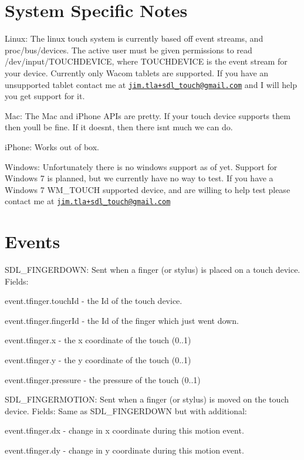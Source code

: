 \section*{System Specific Notes }

Linux\+: The linux touch system is currently based off event streams, and proc/bus/devices. The active user must be given permissions to read /dev/input/\+T\+O\+U\+C\+H\+D\+E\+V\+I\+CE, where T\+O\+U\+C\+H\+D\+E\+V\+I\+CE is the event stream for your device. Currently only Wacom tablets are supported. If you have an unsupported tablet contact me at \href{mailto:jim.tla+sdl_touch@gmail.com}{\tt jim.\+tla+sdl\+\_\+touch@gmail.\+com} and I will help you get support for it.

Mac\+: The Mac and i\+Phone A\+P\+Is are pretty. If your touch device supports them then you\textquotesingle{}ll be fine. If it doesn\textquotesingle{}t, then there isn\textquotesingle{}t much we can do.

i\+Phone\+: Works out of box.

Windows\+: Unfortunately there is no windows support as of yet. Support for Windows 7 is planned, but we currently have no way to test. If you have a Windows 7 W\+M\+\_\+\+T\+O\+U\+CH supported device, and are willing to help test please contact me at \href{mailto:jim.tla+sdl_touch@gmail.com}{\tt jim.\+tla+sdl\+\_\+touch@gmail.\+com} 

 \section*{Events }

S\+D\+L\+\_\+\+F\+I\+N\+G\+E\+R\+D\+O\+WN\+: Sent when a finger (or stylus) is placed on a touch device. Fields\+:
\begin{DoxyItemize}
\item event.\+tfinger.\+touch\+Id -\/ the Id of the touch device.
\item event.\+tfinger.\+finger\+Id -\/ the Id of the finger which just went down.
\item event.\+tfinger.\+x -\/ the x coordinate of the touch (0..1)
\item event.\+tfinger.\+y -\/ the y coordinate of the touch (0..1)
\item event.\+tfinger.\+pressure -\/ the pressure of the touch (0..1)
\end{DoxyItemize}

S\+D\+L\+\_\+\+F\+I\+N\+G\+E\+R\+M\+O\+T\+I\+ON\+: Sent when a finger (or stylus) is moved on the touch device. Fields\+: Same as S\+D\+L\+\_\+\+F\+I\+N\+G\+E\+R\+D\+O\+WN but with additional\+:
\begin{DoxyItemize}
\item event.\+tfinger.\+dx -\/ change in x coordinate during this motion event.
\item event.\+tfinger.\+dy -\/ change in y coordinate during this motion event.
\end{DoxyItemize}

